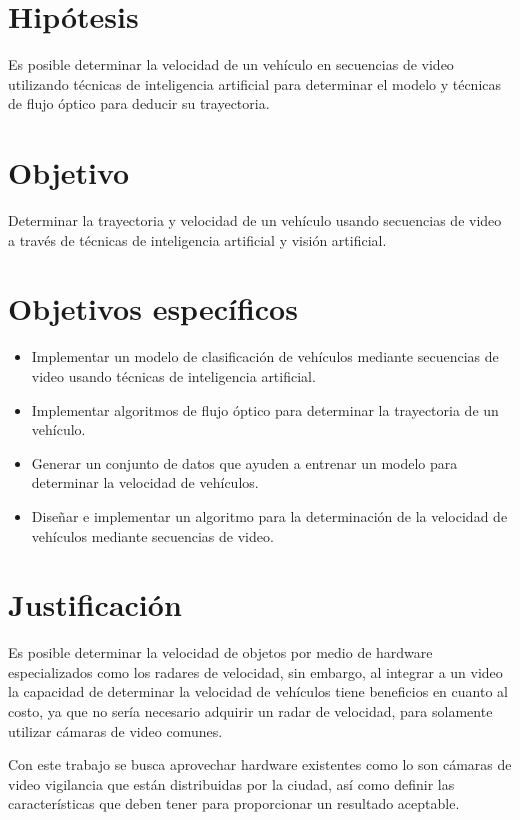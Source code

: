 \section{Hipótesis}

Es posible determinar la velocidad de un vehículo en secuencias de video utilizando técnicas de inteligencia artificial para determinar el modelo y técnicas de flujo óptico para deducir su trayectoria.

\section{Objetivo}

Determinar la trayectoria y velocidad de un vehículo usando secuencias de video a través de técnicas de inteligencia artificial y visión artificial.

\section{Objetivos específicos}

\begin{itemize}
    \item Implementar un modelo de clasificación de vehículos mediante secuencias de video usando técnicas de inteligencia artificial.
    \item Implementar algoritmos de flujo óptico para determinar la trayectoria de un vehículo.
    \item Generar un conjunto de datos que ayuden a entrenar un modelo para determinar la velocidad de vehículos.
    \item Diseñar e implementar un algoritmo para la determinación de la velocidad de vehículos mediante secuencias de video.
\end{itemize}

\section{Justificación}

Es posible determinar la velocidad de objetos por medio de hardware especializados como los radares de velocidad, sin embargo, al integrar a un video la capacidad de determinar la velocidad de vehículos tiene beneficios en cuanto al costo, ya que no sería necesario adquirir un radar de velocidad, para solamente utilizar cámaras de video comunes.

Con este trabajo se busca aprovechar hardware existentes como lo son cámaras de video vigilancia que están distribuidas por la ciudad, así como definir las características que deben tener para proporcionar un resultado aceptable.

